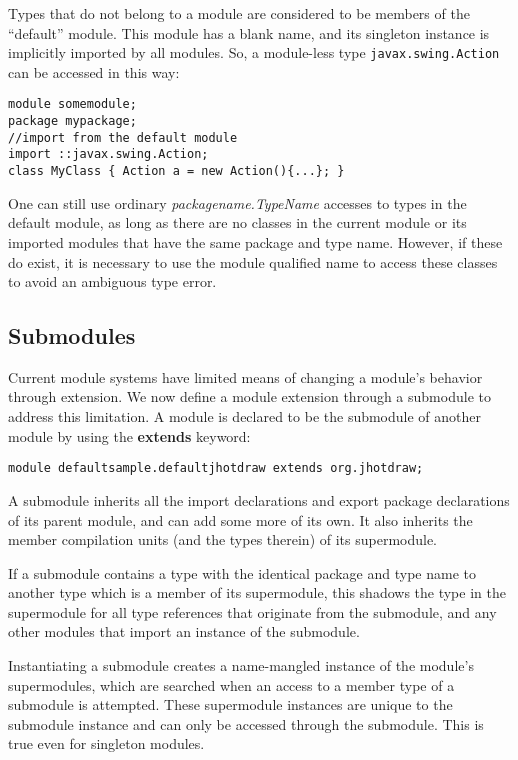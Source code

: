 Types that do not belong to a module are considered to be members of
the ``default'' module. This module has a blank name, and its singleton
instance is implicitly imported by all modules. So, a module-less
type {\tt javax.swing.Action} can be accessed in this way:

\begin{lstlisting}[caption=Default Module Lookups]
module somemodule;
package mypackage;
//import from the default module
import ::javax.swing.Action;
class MyClass {	Action a = new Action(){...}; }
\end{lstlisting}

One can still use ordinary \textit{packagename.TypeName} accesses to types in
the default module, as long as there are no classes in the current module
or its imported modules that have the same package and type name. However,
if these do exist, it is necessary to use the module qualified name to access
these classes to avoid an ambiguous type error.

\subsection{Submodules}

Current module systems have limited means of changing a module's behavior through
extension. We now define a module extension through a submodule to address this limitation. 
A module is declared to be the submodule of another module by using the \textbf{extends} keyword:

\begin{lstlisting}
module defaultsample.defaultjhotdraw extends org.jhotdraw;
\end{lstlisting}

A submodule inherits all the import declarations and export package declarations 
of its parent module, and can add some more of its own. It also inherits the member 
compilation units (and the types therein) of its supermodule.

If a submodule contains a type with the identical package and type name
to another type which is a member of its supermodule, 
this shadows the type in the supermodule for all type references that
originate from the submodule, and any other modules that import an
instance of the submodule.

Instantiating a submodule creates a name-mangled instance of the module's supermodules,
which are searched when an access to a member type of a submodule is attempted. These
supermodule instances are unique to the submodule instance and can only be accessed
through the submodule. This is true even for singleton modules.

